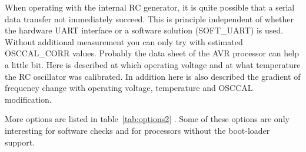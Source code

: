 
When operating with the internal RC generator, it is quite possible that a serial data transfer
not immediately succeed. This is principle independent of whether the hardware UART interface
or a software solution (SOFT\_UART) is used.
Without additional measurement you can only try with estimated OSCCAL\_CORR values.
Probably the data sheet of the AVR processor can help a little bit.
Here is described at which operating voltage and at what temperature the RC oscillator
was calibrated. 
In addition here is also described the gradient of frequency change with operating voltage,
temperature and OSCCAL modification.

More options are listed in table~\ref{tab:options2} . 
Some of these options are only interesting for software checks and
for processors without the boot-loader support.

